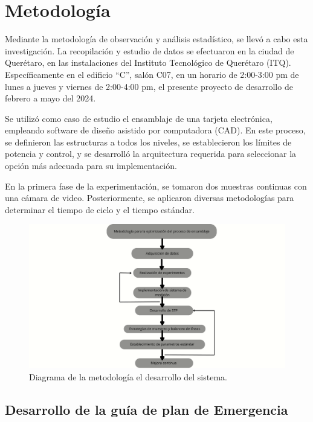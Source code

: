     \section{Metodología}
    
    
    Mediante la metodología de observación y análisis estadístico, se llevó a cabo esta investigación. La recopilación y estudio de datos se efectuaron en la ciudad de Querétaro, en las instalaciones del Instituto Tecnológico de Querétaro (ITQ). Específicamente en el edificio “C”, salón C07, en un horario de 2:00-3:00 pm de lunes a jueves y viernes de 2:00-4:00 pm, el presente proyecto de desarrollo de febrero a mayo del 2024. 
    
    Se utilizó como caso de estudio el ensamblaje de una tarjeta electrónica, empleando software de diseño asistido por computadora (CAD). En este proceso, se definieron las estructuras a todos los niveles, se establecieron los límites de potencia y control, y se desarrolló la arquitectura requerida para seleccionar la opción más adecuada para su implementación.
    
    En la primera fase de la experimentación, se tomaron dos muestras continuas con una cámara de video. Posteriormente, se aplicaron diversas metodologías para determinar el tiempo de ciclo y el tiempo estándar.
    
    \begin{figure}[H]
        \centering
        \includegraphics[scale=0.181]{21/img/diagramaMetodología.pdf}
        \caption{Diagrama de la metodología el desarrollo del sistema.}
        \label{fig:diagramaMetodologia}
    \end{figure}
    
    
    \subsection{Desarrollo de la guía de plan de Emergencia}
    
